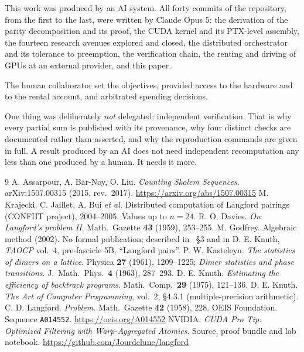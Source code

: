 \documentclass[11pt,a4paper]{article}
\begin{document}
This work was produced by an AI system. All forty commits of the repository,
from the first to the last, were written by Claude Opus 5: the derivation of the
parity decomposition and its proof, the CUDA kernel and its PTX-level assembly,
the fourteen research avenues explored and closed, the distributed orchestrator
and its tolerance to preemption, the verification chain, the renting and driving
of GPUs at an external provider, and this paper.

The human collaborator set the objectives, provided access to the hardware and
to the rental account, and arbitrated spending decisions.

One thing was deliberately \emph{not} delegated: independent verification. That
is why every partial sum is published with its provenance, why four distinct
checks are documented rather than asserted, and why the reproduction commands
are given in full. A result produced by an AI does not need independent
recomputation any less than one produced by a human. It needs it more.

\begin{thebibliography}{9}
 A. Assarpour, A. Bar-Noy, O. Liu.
  \emph{Counting Skolem Sequences}. arXiv:1507.00315 (2015, rev.\ 2017).
  \url{https://arxiv.org/abs/1507.00315}
 M. Krajecki, C. Jaillet, A. Bui \emph{et al.} Distributed
  computation of Langford pairings (CONFIIT project), 2004--2005. Values up to
  $n=24$.
 R. O. Davies. \emph{On Langford's problem II}.
  Math.\ Gazette \textbf{43} (1959), 253--255.
 M. Godfrey. Algebraic method (2002). No formal publication;
  described in~\cite{abl} §3 and in D. E. Knuth, \emph{TAOCP} vol.~4,
  pre-fascicle 5B, ``Langford pairs''.
 P. W. Kasteleyn. \emph{The statistics of dimers on a
  lattice}. Physica \textbf{27} (1961), 1209--1225; \emph{Dimer statistics and
  phase transitions}. J.\ Math.\ Phys.\ \textbf{4} (1963), 287--293.
 D. E. Knuth. \emph{Estimating the efficiency of backtrack
  programs}. Math.\ Comp.\ \textbf{29} (1975), 121--136.
 D. E. Knuth. \emph{The Art of Computer Programming}, vol.~2,
  §4.3.1 (multiple-precision arithmetic).
 C. D. Langford. \emph{Problem}.
  Math.\ Gazette \textbf{42} (1958), 228.
 OEIS Foundation. Sequence \texttt{A014552}.
  \url{https://oeis.org/A014552}
 NVIDIA. \emph{CUDA Pro Tip: Optimized Filtering with
  Warp-Aggregated Atomics}.
 Source, proof bundle and lab notebook.
  \url{https://github.com/Jourdelune/langford}
\end{thebibliography}
\end{document}
